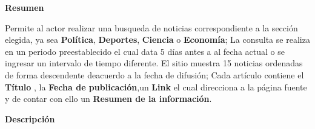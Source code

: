 

\begin{large}
	\textbf{Resumen}\\
\end{large}

Permite al actor realizar una busqueda de noticias correspondiente a la sección elegida, ya sea \textbf{Política}, \textbf{Deportes}, \textbf{Ciencia} o \textbf{Economía}; La consulta se realiza en un periodo preestablecido el cual data 5 días antes a al fecha actual o se ingresar un intervalo de tiempo diferente. El sitio muestra 15 noticias ordenadas de forma descendente deacuerdo a la fecha de difusión; Cada artículo contiene el \textbf{Título} , la \textbf{Fecha de publicación},un \textbf{Link} el cual direcciona a la página fuente y de contar con ello  un \textbf{Resumen de la información}.\\

\begin{large}
	\textbf{Descripción}\\
\end{large}




